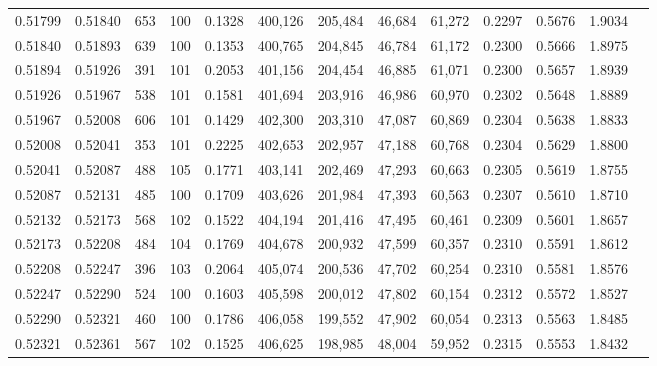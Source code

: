 \begin{tabular}{rrrrrrrrrrrrr}
0.51799 & 0.51840 &   653 & 100 &                                     0.1328 & 400,126 & 205,484 &  46,684 &  61,272 & 0.2297 & 0.5676 & 1.9034 \\
0.51840 & 0.51893 &   639 & 100 &                                     0.1353 & 400,765 & 204,845 &  46,784 &  61,172 & 0.2300 & 0.5666 & 1.8975 \\
0.51894 & 0.51926 &   391 & 101 &                                     0.2053 & 401,156 & 204,454 &  46,885 &  61,071 & 0.2300 & 0.5657 & 1.8939 \\
0.51926 & 0.51967 &   538 & 101 &                                     0.1581 & 401,694 & 203,916 &  46,986 &  60,970 & 0.2302 & 0.5648 & 1.8889 \\
0.51967 & 0.52008 &   606 & 101 &                                     0.1429 & 402,300 & 203,310 &  47,087 &  60,869 & 0.2304 & 0.5638 & 1.8833 \\
0.52008 & 0.52041 &   353 & 101 &                                     0.2225 & 402,653 & 202,957 &  47,188 &  60,768 & 0.2304 & 0.5629 & 1.8800 \\
0.52041 & 0.52087 &   488 & 105 &                                     0.1771 & 403,141 & 202,469 &  47,293 &  60,663 & 0.2305 & 0.5619 & 1.8755 \\
0.52087 & 0.52131 &   485 & 100 &                                     0.1709 & 403,626 & 201,984 &  47,393 &  60,563 & 0.2307 & 0.5610 & 1.8710 \\
0.52132 & 0.52173 &   568 & 102 &                                     0.1522 & 404,194 & 201,416 &  47,495 &  60,461 & 0.2309 & 0.5601 & 1.8657 \\
0.52173 & 0.52208 &   484 & 104 &                                     0.1769 & 404,678 & 200,932 &  47,599 &  60,357 & 0.2310 & 0.5591 & 1.8612 \\
0.52208 & 0.52247 &   396 & 103 &                                     0.2064 & 405,074 & 200,536 &  47,702 &  60,254 & 0.2310 & 0.5581 & 1.8576 \\
0.52247 & 0.52290 &   524 & 100 &                                     0.1603 & 405,598 & 200,012 &  47,802 &  60,154 & 0.2312 & 0.5572 & 1.8527 \\
0.52290 & 0.52321 &   460 & 100 &                                     0.1786 & 406,058 & 199,552 &  47,902 &  60,054 & 0.2313 & 0.5563 & 1.8485 \\
0.52321 & 0.52361 &   567 & 102 &                                     0.1525 & 406,625 & 198,985 &  48,004 &  59,952 & 0.2315 & 0.5553 & 1.8432 \\

\end{tabular}
